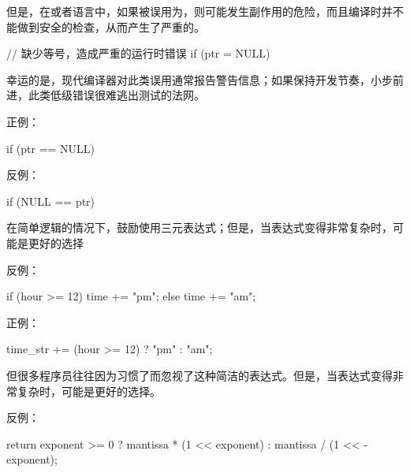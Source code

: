 \begin{content}
但是，在\clang{}或者\cpp{}语言中，如果\ascii{==}被误用为\ascii{=}，则可能发生副作用的危险，而且编译时并不能做到安全的检查，从而产生了严重的。

\begin{leftbar}
\begin{c++}
// 缺少等号，造成严重的运行时错误
if (ptr = NULL)
\end{c++}
\end{leftbar}

幸运的是，现代编译器对此类误用通常报告警告信息；如果保持开发节奏，小步前进，此类低级错误很难逃出测试的法网。

正例：
\begin{leftbar}
\begin{c++}
if (ptr == NULL)
\end{c++}
\end{leftbar}

反例：
\begin{leftbar}
\begin{c++}
if (NULL == ptr)
\end{c++}
\end{leftbar}


\begin{regulation}
在简单逻辑的情况下，鼓励使用三元表达式；但是，当表达式变得非常复杂时，可能是更好的选择
\end{regulation}

反例：
\begin{leftbar}
\begin{c++}
if (hour >= 12) 
{
    time += "pm";
} 
else 
{
    time += "am";
}
\end{c++}
\end{leftbar}

正例：
\begin{leftbar}
\begin{c++}
time_str += (hour >= 12) ? "pm" : "am";
\end{c++}
\end{leftbar}

但很多程序员往往因为习惯了而忽视了这种简洁的表达式。但是，当表达式变得非常复杂时，可能是更好的选择。

反例：
\begin{leftbar}
\begin{c++}
return exponent >= 0 ? mantissa * (1 << exponent) : mantissa / (1 << -exponent);
\end{c++}
\end{leftbar}


\end{content}
